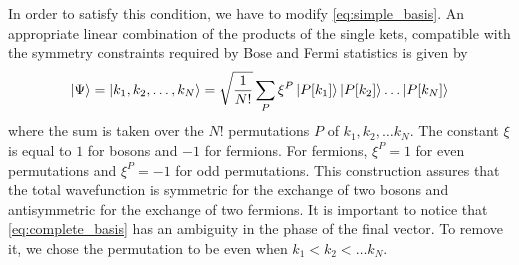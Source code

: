 In order to satisfy this condition, we have to modify \cref{eq:simple_basis}. An appropriate linear combination of the products of the single kets, compatible with the symmetry constraints required by Bose and Fermi statistics is given by
\begin{equation} \label{eq:complete_basis}
    \ket{\Psi} = \ket{k_1, k_2, \dots, k_N} = \sqrt{\frac{1}{N!}} \sum_P \xi^P \ket{P[k_1]}\ket{P[k_2]}\dots\ket{P[k_N]}
\end{equation}
where the sum is taken over the $N!$ permutations $P$ of ${k_1, k_2, \dots k_N}$. The constant $\xi$ is equal to $1$ for bosons and $-1$ for fermions. For fermions, $\xi^P = 1$ for even permutations and $\xi^P = -1$ for odd permutations. This construction assures that the total wavefunction is symmetric for the exchange of two bosons and antisymmetric for the exchange of two fermions. It is important to notice that \cref{eq:complete_basis} has an ambiguity in the phase of the final vector. To remove it, we chose the permutation to be even when $k_1 < k_2 < \dots k_N$.


